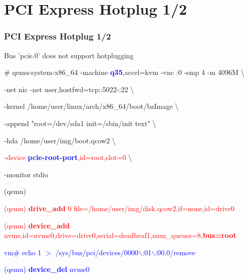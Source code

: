 \documentclass[aspectratio=169]{beamer}
\begin{document}

\section{PCI Express Hotplug 1/2}
\begin{frame}
\frametitle{PCI Express Hotplug 1/2}
{\Large Bus 'pcie.0' does not support hotplugging}
\begin{block}{}
\small
\# qemu-system-x86\_64 -machine \textbf{\textcolor{blue}{q35}},accel=kvm -vnc :0 -smp 4 -m 4096M \textbackslash

-net nic -net user,hostfwd=tcp::5022-:22 \textbackslash

-kernel /home/user/linux/arch/x86\_64/boot/bzImage \textbackslash
	
-append "root=/dev/sda1 init=/sbin/init text" \textbackslash

-hda /home/user/img/boot.qcow2 \textbackslash

\textcolor{red}{-device \textbf{\textcolor{blue}{pcie-root-port}},id=root,slot=0} \textbackslash

-monitor stdio

(qemu)
\end{block}
\begin{block}{}
\textcolor{red}{(qemu) \textbf{drive\_add} 0 file=/home/user/img/disk.qcow2,if=none,id=drive0}

\textcolor{red}{(qemu) \textbf{device\_add} nvme,id=nvme0,drive=drive0,serial=deadbeaf1,num\_queues=8,\textbf{bus=root}} \newline

\textcolor{blue}{vm\# echo 1 $>$ /sys/bus/pci/devices/0000$\backslash$:01$\backslash$:00.0/remove}

\textcolor{blue}{(qemu) \textbf{device\_del} nvme0}
\end{block}
\end{frame}

\end{document}
